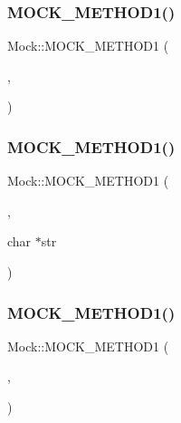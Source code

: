 \mbox{\label{class_mock_ada59eea6991953353f332e3ea1e74444}} 
\subsubsection{\texorpdfstring{M\+O\+C\+K\+\_\+\+M\+E\+T\+H\+O\+D1()}{MOCK\_METHOD1()}\hspace{0.1cm}{\footnotesize\ttfamily [1/9]}}
{\footnotesize\ttfamily Mock\+::\+M\+O\+C\+K\+\_\+\+M\+E\+T\+H\+O\+D1 (\begin{DoxyParamCaption}\item[{\hyperlink{class_interface_a65d6ae604e7e9a513aec72c9c94e0b97}{Void\+From\+String}}]{,  }\item[{void(char $\ast$str)}]{ }\end{DoxyParamCaption})}

\mbox{\label{class_mock_a2db4d82b6f92b4e462929f651ac4c3b1}} 
\subsubsection{\texorpdfstring{M\+O\+C\+K\+\_\+\+M\+E\+T\+H\+O\+D1()}{MOCK\_METHOD1()}\hspace{0.1cm}{\footnotesize\ttfamily [2/9]}}
{\footnotesize\ttfamily Mock\+::\+M\+O\+C\+K\+\_\+\+M\+E\+T\+H\+O\+D1 (\begin{DoxyParamCaption}\item[{\hyperlink{class_interface_a756b1d22c12aa3f14a5083f90043fbf0}{String\+From\+String}}]{,  }\item[{char $\ast$}]{char $\ast$str }\end{DoxyParamCaption})}

\mbox{\label{class_mock_ae73b4ee90bf6d84205d2b1c17f0b8433}} 
\subsubsection{\texorpdfstring{M\+O\+C\+K\+\_\+\+M\+E\+T\+H\+O\+D1()}{MOCK\_METHOD1()}\hspace{0.1cm}{\footnotesize\ttfamily [3/9]}}
{\footnotesize\ttfamily Mock\+::\+M\+O\+C\+K\+\_\+\+M\+E\+T\+H\+O\+D1 (\begin{DoxyParamCaption}\item[{\hyperlink{class_interface_ab34c8a5fd2236a6b009f86a4e5851b61}{Int\+From\+String}}]{,  }\item[{int(char $\ast$str)}]{ }\end{DoxyParamCaption})}

